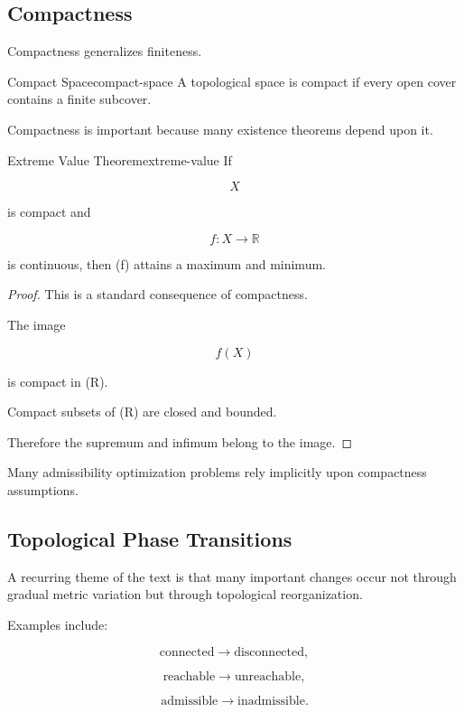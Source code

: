 \documentclass[12pt,twoside,openright]{book}
\begin{document}
\subsection{Compactness}

Compactness generalizes finiteness.

\begin{definition}{Compact Space}{compact-space}
A topological space is compact if every open cover
contains a finite subcover.
\end{definition}

Compactness is important because many existence theorems
depend upon it.

\begin{theorem}{Extreme Value Theorem}{extreme-value}
If

\[
X
\]

is compact and

\[
f:X\rightarrow\mathbb R
\]

is continuous, then (f) attains a maximum and minimum.
\end{theorem}

\begin{proof}
This is a standard consequence of compactness.

The image

\[
f(X)
\]

is compact in (\mathbb R).

Compact subsets of (\mathbb R) are closed and bounded.

Therefore the supremum and infimum belong to the image.
\end{proof}

Many admissibility optimization problems rely implicitly
upon compactness assumptions.

\subsection{Topological Phase Transitions}

A recurring theme of the text is that many important
changes occur not through gradual metric variation but
through topological reorganization.

Examples include:

\[
\text{connected}
\rightarrow
\text{disconnected},
\]

\[
\text{reachable}
\rightarrow
\text{unreachable},
\]

\[
\text{admissible}
\rightarrow
\text{inadmissible}.
\]
\end{document}
